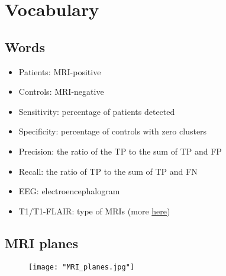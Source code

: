 \chapter{Vocabulary}

\section{Words}

\begin{itemize}
	\item Patients: MRI-positive
	\item Controls: MRI-negative
	\item Sensitivity: percentage of patients detected
	\item Specificity: percentage of controls with zero clusters
	\item Precision: the ratio of the TP to the sum of TP and FP
	\item Recall: the ratio of TP to the sum of TP and FN
	\item EEG: electroencephalogram
	\item T1/T1-FLAIR: type of MRIs (more \href{https://mriquestions.com/t1-flair.html}{here})
\end{itemize}

\section{MRI planes}

\begin{figure}[htbp]
	\centering
	\texttt{[image: "MRI\_planes.jpg"]}
\end{figure}
